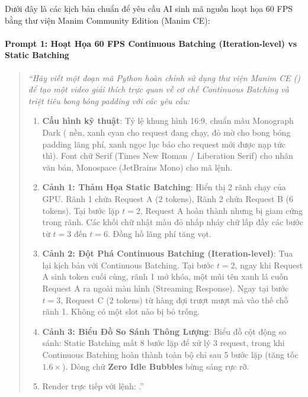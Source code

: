 \begin{simulationbox}
Dưới đây là các kịch bản chuẩn để yêu cầu AI sinh mã nguồn hoạt họa 60 FPS bằng thư viện Manim Community Edition (Manim CE):

\paragraph{Prompt 1: Hoạt Họa 60 FPS Continuous Batching (Iteration-level) vs Static Batching}
\begin{quote}\small\itshape
``Hãy viết một đoạn mã Python hoàn chỉnh sử dụng thư viện Manim CE () để tạo một video giải thích trực quan về cơ chế Continuous Batching và triệt tiêu bong bóng padding với các yêu cầu:
\begin{enumerate}
  \item \textbf{Cấu hình kỹ thuật}: Tỷ lệ khung hình 16:9, chuẩn màu Monograph Dark ( nền,  xanh cyan cho request đang chạy,  đỏ mờ cho bong bóng padding lãng phí,  xanh ngọc lục bảo cho request mới được nạp tức thì). Font chữ Serif (Times New Roman / Liberation Serif) cho nhãn văn bản, Monospace (JetBrains Mono) cho mã lệnh.
  \item \textbf{Cảnh 1: Thảm Họa Static Batching}: Hiển thị 2 rãnh chạy của GPU. Rãnh 1 chứa Request A ($2$ tokens), Rãnh 2 chứa Request B ($6$ tokens). Tại bước lặp $t=2$, Request A hoàn thành nhưng bị giam cứng trong rãnh. Các khối chữ nhật màu đỏ nhấp nháy chữ  lấp đầy các bước từ $t=3$ đến $t=6$. Đồng hồ lãng phí tăng vọt.
  \item \textbf{Cảnh 2: Đột Phá Continuous Batching (Iteration-level)}: Tua lại kịch bản với Continuous Batching. Tại bước $t=2$, ngay khi Request A sinh token cuối cùng, rãnh 1 mở khóa, một mũi tên xanh lá cuốn Request A ra ngoài màn hình (Streaming Response). Ngay tại bước $t=3$, Request C ($2$ tokens) từ hàng đợi trượt mượt mà vào thế chỗ rãnh 1. Không có một slot nào bị bỏ trống.
  \item \textbf{Cảnh 3: Biểu Đồ So Sánh Thông Lượng}: Biểu đồ cột động so sánh: Static Batching mất 8 bước lặp để xử lý 3 request, trong khi Continuous Batching hoàn thành toàn bộ chỉ sau 5 bước lặp (tăng tốc $1.6\times$). Dòng chữ \textbf{Zero Idle Bubbles} bừng sáng rực rỡ.
  \item Render trực tiếp với lệnh: .''
\end{enumerate}
\end{quote}


\end{simulationbox}
